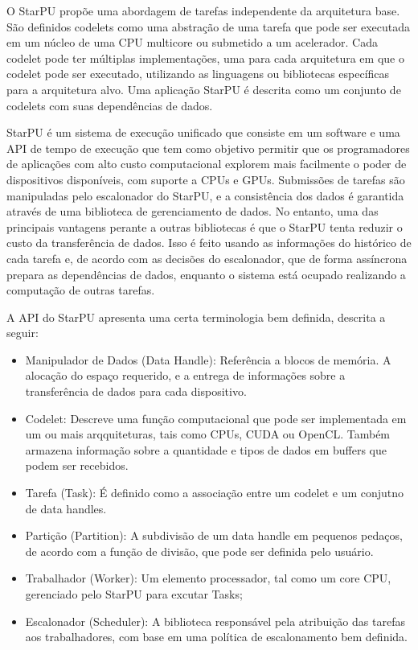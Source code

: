  O StarPU propõe uma abordagem de tarefas independente da arquitetura base. São definidos codelets como uma abstração de uma tarefa que pode ser executada em um núcleo de uma CPU multicore ou submetido a um acelerador. Cada codelet pode ter múltiplas implementações, uma para cada arquitetura em que o codelet pode ser executado, utilizando as linguagens ou bibliotecas específicas para a arquitetura alvo. Uma aplicação StarPU é descrita como um conjunto de codelets com suas dependências de dados.

StarPU é um sistema de execução unificado que consiste em um software e uma API de tempo de execução que tem como objetivo permitir que os programadores de aplicações com alto custo  computacional explorem mais facilmente o poder de dispositivos disponíveis, com suporte a CPUs e GPUs. Submissões de tarefas são manipuladas pelo escalonador do StarPU, e a consistência dos dados é garantida através de uma biblioteca de gerenciamento de dados. 
No entanto, uma das principais vantagens perante a outras bibliotecas é que o StarPU tenta reduzir o custo da transferência de dados. Isso é feito usando as informações do histórico de cada tarefa e, de acordo com as decisões do escalonador, que de forma assíncrona prepara as dependências de dados, enquanto o sistema está ocupado realizando a computação de outras tarefas. 

A API do StarPU apresenta uma certa terminologia bem definida, descrita a seguir:

\begin{itemize}
	\item Manipulador de Dados (Data Handle): Referência a blocos de memória. A alocação do espaço requerido, e a entrega de informações sobre a transferência de dados para cada dispositivo.
	\item Codelet: Descreve uma função computacional que pode ser implementada em um ou mais arqquiteturas, tais como CPUs, CUDA ou OpenCL. Também armazena informação sobre a quantidade e tipos de dados em buffers que podem ser recebidos.
	\item Tarefa (Task): É definido como a  associação entre um codelet e um conjutno de data handles.
	\item Partição (Partition): A subdivisão de um data handle em pequenos pedaços, de acordo com a função de divisão, que pode ser definida pelo usuário.
	\item Trabalhador (Worker): Um elemento processador, tal como um core CPU, gerenciado pelo StarPU para excutar Tasks;
	\item Escalonador (Scheduler): A biblioteca responsável pela atribuição das tarefas aos trabalhadores, com base em uma política de escalonamento bem definida.

\end{itemize}


